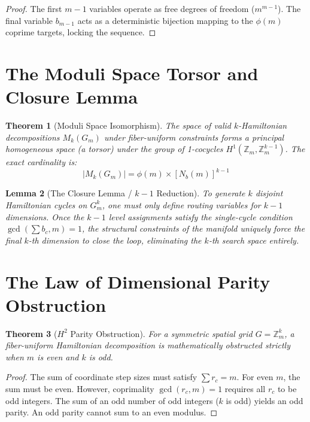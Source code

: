 \documentclass[12pt,a4paper]{article}
\newtheorem{theorem}{Theorem}[section]
\newtheorem{lemma}[theorem]{Lemma}
\begin{document}
\begin{proof}
The first $m-1$ variables operate as free degrees of freedom ($m^{m-1}$). The final variable $b_{m-1}$ acts as a deterministic bijection mapping to the $\phi(m)$ coprime targets, locking the sequence.
\end{proof}

\section{The Moduli Space Torsor and Closure Lemma}

\begin{theorem}[Moduli Space Isomorphism]
The space of valid $k$-Hamiltonian decompositions $M_k(G_m)$ under fiber-uniform constraints forms a principal homogeneous space (a torsor) under the group of 1-cocycles $H^1(\mathbb{Z}_m, \mathbb{Z}_m^{k-1})$. The exact cardinality is:
\[ |M_k(G_m)| = \phi(m) \times [N_b(m)]^{k-1} \]
\end{theorem}

\begin{lemma}[The Closure Lemma / $k-1$ Reduction]
To generate $k$ disjoint Hamiltonian cycles on $G_m^k$, one must only define routing variables for $k-1$ dimensions. Once the $k-1$ level assignments satisfy the single-cycle condition $\gcd(\sum b_c, m)=1$, the structural constraints of the manifold uniquely force the final $k$-th dimension to close the loop, eliminating the $k$-th search space entirely.
\end{lemma}

\section{The Law of Dimensional Parity Obstruction}

\begin{theorem}[$H^2$ Parity Obstruction]
For a symmetric spatial grid $G = \mathbb{Z}_m^k$, a fiber-uniform Hamiltonian decomposition is mathematically obstructed strictly when $m$ is even and $k$ is odd.
\end{theorem}

\begin{proof}
The sum of coordinate step sizes must satisfy $\sum r_c = m$. For even $m$, the sum must be even. However, coprimality $\gcd(r_c, m) = 1$ requires all $r_c$ to be odd integers. The sum of an odd number of odd integers ($k$ is odd) yields an odd parity. An odd parity cannot sum to an even modulus.
\end{proof}
\end{document}

